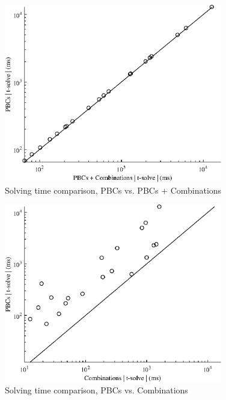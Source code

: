 {\begin{figure}
    \centering
    \includegraphics[width = 0.85\textwidth]{Figures/opt_solve_2_1.eps}
    \caption{Solving time comparison, PBCs vs. PBCs + Combinations}
    \label{opt_solve_2_1}
\end{figure}

\begin{figure}
    \centering
    \includegraphics[width = 0.85\textwidth]{Figures/opt_solve_3_1.eps}
    \caption{Solving time comparison, PBCs vs. Combinations}
    \label{opt_solve_3_1}
\end{figure}
}